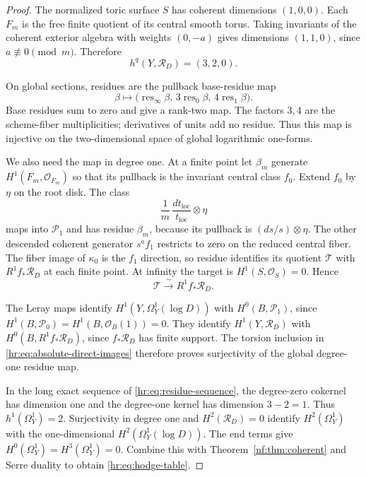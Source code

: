 \begin{proof}
The normalized toric surface $S$ has coherent dimensions
$(1,0,0)$. Each $F_m$ is the free finite quotient of its
central smooth torus. Taking invariants of the coherent
exterior algebra with weights $(0,-a)$ gives dimensions
$(1,1,0)$, since $a\not\equiv0\pmod m$.
Therefore
\[
 h^q(Y,\mathcal R_D)=(3,2,0).
\]

On global sections, residues are the pullback
base-residue map
\begin{equation}\label{hr:eq:base-residues}
 \beta\longmapsto
 \bigl(\operatorname{res}_\infty\beta,\,
       3\operatorname{res}_0\beta,\,
       4\operatorname{res}_1\beta\bigr).
\end{equation}
Base residues sum to zero and give a rank-two map.
The factors $3,4$ are the scheme-fiber multiplicities;
derivatives of units add no residue. Thus this map is
injective on the two-dimensional space of global
logarithmic one-forms.

We also need the map in degree one. At a finite point
let $\beta_m$ generate $H^1(F_m,\mathcal O_{F_m})$ so
that its pullback is the invariant central class $f_0$.
Extend $f_0$ by $\eta$ on the root disk. The class
\begin{equation}\label{hr:eq:normalized-residue}
 \frac1m\,\frac{dt_{\mathrm{loc}}}{t_{\mathrm{loc}}}
                       \otimes\eta
\end{equation}
maps into $\mathcal P_1$ and has residue $\beta_m$,
because its pullback is $(ds/s)\otimes\eta$.
The other descended coherent generator $s^af_1$
restricts to zero on the reduced central fiber.
The fiber image of $\kappa_0$ is the $f_1$ direction,
so residue identifies its quotient
$\mathcal T$ with $R^1f_*\mathcal R_D$ at each finite
point. At infinity the target is
$H^1(S,\mathcal O_S)=0$. Hence
\[
 \mathcal T\xrightarrow{\ \sim\ }R^1f_*\mathcal R_D.
\]

The Leray maps identify
$H^1(Y,\Omega_Y^1(\log D))$ with
$H^0(B,\mathcal P_1)$, since
$H^1(B,\mathcal P_0)=H^1(B,\mathcal O_B(1))=0$.
They identify $H^1(Y,\mathcal R_D)$ with
$H^0(B,R^1f_*\mathcal R_D)$, since $f_*\mathcal R_D$
has finite support. The torsion inclusion in
\eqref{hr:eq:absolute-direct-images} therefore proves
surjectivity of the global degree-one residue map.

In the long exact sequence of
\eqref{hr:eq:residue-sequence}, the degree-zero
cokernel has dimension one and the degree-one kernel
has dimension $3-2=1$. Thus $h^1(\Omega_Y^1)=2$.
Surjectivity in degree one and $H^2(\mathcal R_D)=0$
identify $H^2(\Omega_Y^1)$ with the one-dimensional
$H^2(\Omega_Y^1(\log D))$. The end terms give
$H^0(\Omega_Y^1)=H^3(\Omega_Y^1)=0$.
Combine this with Theorem~\ref{nf:thm:coherent} and
Serre duality to obtain \eqref{hr:eq:hodge-table}.
\end{proof}

